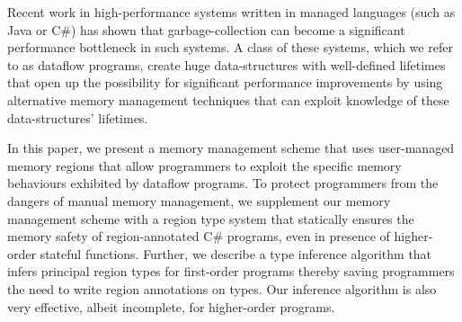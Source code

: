 Recent work in high-performance systems written in managed languages (such as Java or C\#) has shown
that garbage-collection can become a significant performance bottleneck in such systems.
A class of these systems, which we refer to as dataflow programs, create huge data-structures with well-defined
lifetimes that open up the possibility for significant performance improvements by using alternative memory
management techniques that can exploit knowledge of these data-structures' lifetimes.

In this paper, we present a memory management scheme that uses user-managed
memory regions that allow programmers to exploit the specific memory behaviours exhibited by dataflow programs.
To protect programmers from the dangers of manual memory management, we
supplement our memory management scheme with a region type system that
statically ensures the memory safety of region-annotated C\# programs,
even in presence of higher-order stateful functions. Further, we
describe a type inference algorithm that infers principal region types
for first-order programs thereby saving programmers the need to write
region annotations on types. Our inference algorithm is also very
effective, albeit incomplete, for higher-order programs.

